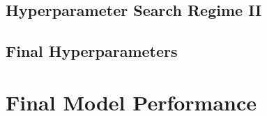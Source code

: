 







\subsection{Hyperparameter Search Regime II}





\subsection{Final Hyperparameters}

\section{Final Model Performance}

